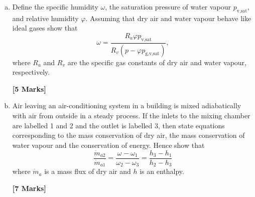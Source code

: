 \documentclass[calculator,refrigeranttables,datasheet,resit]{exam}
\newcommand{\frc}{\displaystyle\frac}
\begin{document}
\clearpage

\begin{question} \vspace{-2\baselineskip}
\begin{enumerate}[(a)] 
\item Define the specific humidity $\omega$, the saturation pressure of water vapour $p_{\text{v,sat}}$, and relative humidity $\varphi$. Assuming that dry air and water vapour behave like ideal gases show that
\begin{displaymath}
\omega = \frc{R_{a}\varphi p_{\text{v,sat}}}{R_{v}\left(p - \varphi p_{\text{g,v,sat}}\right)},
\end{displaymath}
where $R_{a}$ and $R_{v}$ are the specific gas constants of dry air and water vapour, respectively. 
\begin{flushright}
{\bf [5 Marks]}
\end{flushright} 

\item Air leaving an air-conditioning system in a building is mixed adiabatically with air from outside in a steady process. If the inlets to the mixing chamber are labelled 1 and 2 and the outlet is labelled 3, then state equations corresponding to the mass conservation of dry air, the mass conservation of water vapour and the conservation of energy. Hence show that
\begin{displaymath}
\frc{\dot{m}_{a2}}{\dot{m}_{a1}} = \frc{\omega_{}-\omega_{1}}{\omega_{2}-\omega_{3}} = \frc{h_{3}-h_{1}}{h_{2}-h_{3}}
\end{displaymath}
where $\dot{m}_{a}$  is a mass flux of dry air and $h$ is an enthalpy.
\begin{flushright}
{\bf [7 Marks]}
\end{flushright} 


\end{enumerate}
\end{question}
\end{document}
